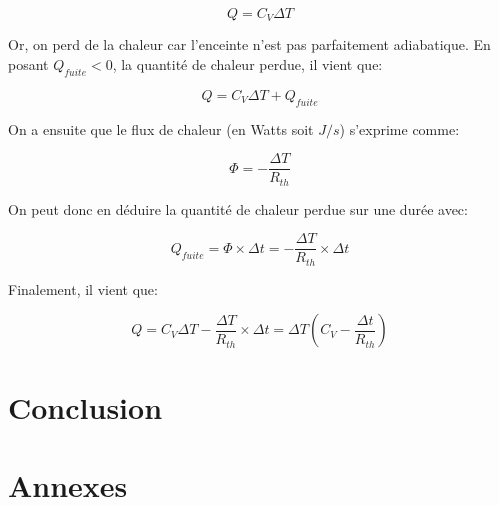 \documentclass[12pt]{article}
\begin{document}
\begin{equation}
	Q = C_V \Delta T
\end{equation}

Or, on perd de la chaleur car l'enceinte n'est pas parfaitement adiabatique. En posant $Q_{fuite} < 0$, la quantité de chaleur perdue, il vient que:

\begin{equation}
	Q = C_V \Delta T + Q_{fuite}
\end{equation}

On a ensuite que le flux de chaleur (en Watts soit $J/s$) s'exprime comme:

\begin{equation}
	\Phi = - \frac{\Delta T}{R_{th}}
\end{equation}

On peut donc en déduire la quantité de chaleur perdue sur une durée avec:

\begin{equation}
	Q_{fuite} = \Phi \times \Delta t = - \frac{\Delta T}{R_{th}} \times \Delta t
\end{equation}

Finalement, il vient que:

\begin{equation}
	Q = C_V \Delta T - \frac{\Delta T}{R_{th}} \times \Delta t = \Delta T \left( C_V - \frac{\Delta t}{R_{th}} \right)
\end{equation}

\section{Conclusion}

\newpage
\section*{Annexes}
\end{document}
